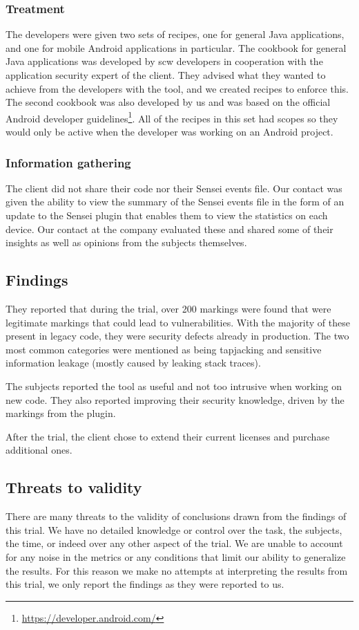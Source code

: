 \subsubsection{Treatment}
The developers were given two sets of recipes, one for general Java applications, and one for mobile Android applications in particular.
The cookbook for general Java applications was developed by \gls{scw} developers in cooperation with the application security expert of the client.
They advised what they wanted to achieve from the developers with the tool, and we created recipes to enforce this.
The second cookbook was also developed by us and was based on the official Android developer guidelines\footnote{\url{https://developer.android.com/}}.
All of the recipes in this set had scopes so they would only be active when the developer was working on an Android project.

\subsubsection{Information gathering}
The client did not share their code nor their Sensei events file.
Our contact was given the ability to view the summary of the Sensei events file in the form of an update to the Sensei plugin that enables them to view the statistics on each device.
Our contact at the company evaluated these and shared some of their insights as well as opinions from the subjects themselves.

\subsection{Findings}
They reported that during the trial, over 200 markings were found that were legitimate markings that could lead to vulnerabilities. With the majority of these present in legacy code, they were \glspl{security defect} already in production. The two most common categories were mentioned as being tapjacking and sensitive information leakage (mostly caused by leaking stack traces).

The subjects reported the tool as useful and not too intrusive when working on new code. They also reported improving their security knowledge, driven by the markings from the plugin.

After the trial, the client chose to extend their current licenses and purchase additional ones.

\subsection{Threats to validity}
There are many threats to the validity of conclusions drawn from the findings of this trial. We have no detailed knowledge or control over the task, the subjects, the time, or indeed over any other aspect of the trial. We are unable to account for any noise in the metrics or any conditions that limit our ability to generalize the results. For this reason we make no attempts at interpreting the results from this trial, we only report the findings as they were reported to us.